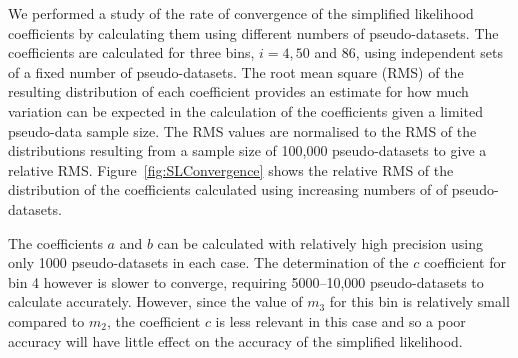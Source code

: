 \documentclass[11pt]{article}
\begin{document}
We performed a study of the rate of convergence of the simplified likelihood coefficients by calculating them using different numbers of pseudo-datasets. 
The coefficients are calculated for three bins, $i=4,50$ and $86$, using independent sets of a fixed number of pseudo-datasets. The root mean square (RMS) 
of the resulting distribution of each coefficient provides an estimate for how much variation can be expected in the calculation 
of the coefficients given a limited pseudo-data sample size. The RMS values are normalised to the RMS of the distributions resulting from a sample size of 
100,000 pseudo-datasets to give a relative RMS. Figure~\ref{fig:SLConvergence} shows the relative RMS of the distribution of the 
coefficients calculated using increasing numbers of of pseudo-datasets. 

The coefficients $a$ and $b$ can be calculated with relatively high precision using only 1000 pseudo-datasets in each case. The determination of 
the $c$ coefficient for bin 4 
however is slower to converge, requiring 5000--10,000 pseudo-datasets to calculate accurately. However, since the value of $m_{3}$ for this bin is 
relatively small compared to $m_{2}$, the coefficient $c$ is less relevant in this case and so a poor accuracy will have little effect on the accuracy of 
the simplified likelihood.




\end{document}
